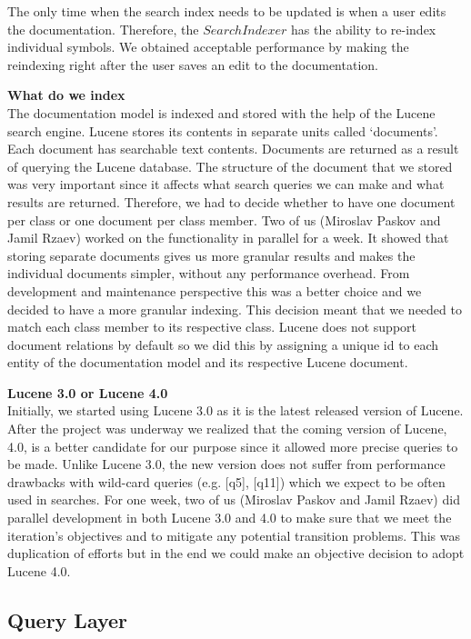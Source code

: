 The only time when the search index needs to be updated is when a user edits the documentation. Therefore, the $SearchIndexer$ has the ability to re-index individual symbols. We  obtained acceptable  performance by making the reindexing right after the user saves an edit to the documentation.

\textbf{What do we index}\\
The documentation model is indexed and stored with the help of the Lucene search engine. 
Lucene stores its contents in separate units called ‘documents’. Each document has searchable text contents. Documents are returned as a result of querying the Lucene database. The structure of the document that we stored was very important since it affects what search queries we can make and what results are returned. Therefore, we had to decide whether to have one document per class or one document per class member. Two of us (Miroslav Paskov and Jamil Rzaev) worked on the functionality in parallel for a week. It showed that storing separate documents gives us more granular results and makes the individual documents simpler, without any performance overhead. From development and maintenance perspective this was a better choice and we decided to have a more granular indexing. This decision meant that we needed to match each class member to its respective class. Lucene does not support document relations by default so we did this by assigning a unique id to each entity of the documentation model and its respective Lucene document. 

\textbf{Lucene 3.0 or Lucene 4.0}\\
Initially, we started using Lucene 3.0 as it is the latest released version of Lucene. After the project was underway we realized that the coming version of Lucene, 4.0, is a better candidate for our purpose since it allowed more precise queries to be made. Unlike Lucene 3.0, the new version does not suffer from performance drawbacks with wild-card queries (e.g. [q5], [q11]) which we expect to be often used in searches. For one week, two of us (Miroslav Paskov and Jamil Rzaev) did parallel development in both Lucene 3.0 and 4.0 to make sure that we meet the iteration’s objectives and to mitigate any potential transition problems. This was duplication of efforts but in the end we could make an objective decision to adopt Lucene 4.0.

\subsection*{Query Layer}

